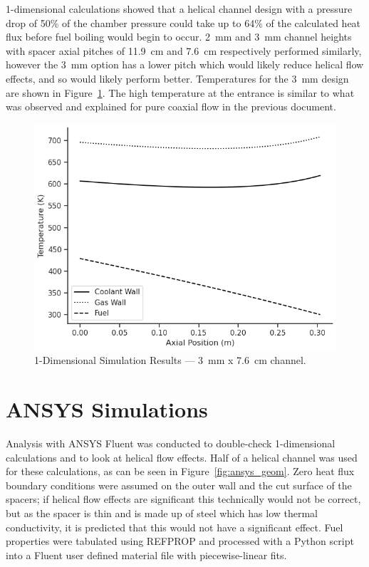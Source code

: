 \documentclass[11pt]{article}
\begin{document}
1-dimensional calculations showed that a helical channel design with a pressure drop of 50\% of the chamber pressure could take up to 64\% of the calculated heat flux before fuel boiling would begin to occur. \SI{2}{\milli\meter} and \SI{3}{\milli\meter} channel heights with spacer axial pitches of \SI{11.9}{\centi\meter} and \SI{7.6}{\centi\meter} respectively performed similarly, however the \SI{3}{\milli\meter} option has a lower pitch which would likely reduce helical flow effects, and so would likely perform better. Temperatures for the \SI{3}{\milli\meter} design are shown in Figure~\ref{fig:one_dimensional}. The high temperature at the entrance is similar to what was observed and explained for pure coaxial flow in the previous document.

\begin{figure}[H]
	\centering
  	\includegraphics[width=0.7\linewidth]{Temperatures_3mm}
  	\caption{1-Dimensional Simulation Results --- \SI{3}{\milli\meter} x \SI{7.6}{\centi\meter} channel.}
  	\label{fig:one_dimensional}
\end{figure}

\section{ANSYS Simulations}

Analysis with ANSYS Fluent was conducted to double-check 1-dimensional calculations and to look at helical flow effects. Half of a helical channel was used for these calculations, as can be seen in Figure~\ref{fig:ansys_geom}. Zero heat flux boundary conditions were assumed on the outer wall and the cut surface of the spacers; if helical flow effects are significant this technically would not be correct, but as the spacer is thin and is made up of steel which has low thermal conductivity, it is predicted that this would not have a significant effect. Fuel properties were tabulated using REFPROP and processed with a Python script into a Fluent user defined material file with piecewise-linear fits.
\end{document}
